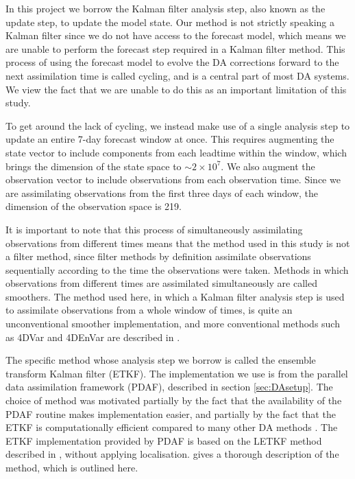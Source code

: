 In this project we borrow the Kalman filter analysis step, also known as the update step, to update the model state. Our method is not strictly speaking a Kalman filter since we do not have access to the forecast model, which means we are unable to perform the forecast step required in a Kalman filter method. This process of using the forecast model to evolve the DA corrections forward to the next assimilation time is called cycling, and is a central part of most DA systems. We view the fact that we are unable to do this as an important limitation of this study.

To get around the lack of cycling, we instead make use of a single analysis step to update an entire 7-day forecast window at once. This requires augmenting the state vector to include components from each leadtime within the window, which brings the dimension of the state space to $\sim 2 \times 10^7$. We also augment the observation vector to include observations from each observation time. Since we are assimilating observations from the first three days of each window, the dimension of the observation space is 219.

It is important to note that this process of simultaneously assimilating observations from different times means that the method used in this study is not a filter method, since filter methods by definition assimilate observations sequentially according to the time the observations were taken. Methods in which observations from different times are assimilated simultaneously are called smoothers. The method used here, in which a Kalman filter analysis step is used to assimilate observations from a whole window of times, is quite an unconventional smoother implementation, and more conventional methods such as 4DVar and 4DEnVar are described in \citet{Bannister2017}.

The specific method whose analysis step we borrow is called the ensemble transform Kalman filter (ETKF). The implementation we use is from the parallel data assimilation framework (PDAF), described in section \ref{sec:DAsetup}. The choice of method was motivated partially by the fact that the availability of the PDAF routine makes implementation easier, and partially by the fact that the ETKF is computationally efficient compared to many other DA methods \citep{Hunt2007}. The ETKF implementation provided by PDAF is based on the LETKF method described in \citet{Hunt2007}, without applying localisation. \citet{Asch2016} gives a thorough description of the method, which is outlined here.

